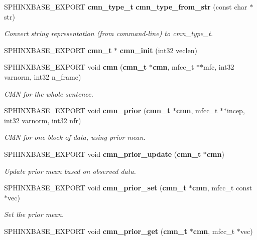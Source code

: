 \begin{DoxyCompactItemize}
\item 
\-S\-P\-H\-I\-N\-X\-B\-A\-S\-E\-\_\-\-E\-X\-P\-O\-R\-T {\bf cmn\-\_\-type\-\_\-t} {\bf cmn\-\_\-type\-\_\-from\-\_\-str} (const char $\ast$str)\label{cmn_8h_acf5e65a03a0d74630add4a400fed0ce8}

\begin{DoxyCompactList}\small\item\em \-Convert string representation (from command-\/line) to cmn\-\_\-type\-\_\-t. \end{DoxyCompactList}\item 
\-S\-P\-H\-I\-N\-X\-B\-A\-S\-E\-\_\-\-E\-X\-P\-O\-R\-T {\bf cmn\-\_\-t} $\ast$ {\bfseries cmn\-\_\-init} (int32 veclen)\label{cmn_8h_a7ba6ce5489afce232b9bb61bd2ebd20f}

\item 
\-S\-P\-H\-I\-N\-X\-B\-A\-S\-E\-\_\-\-E\-X\-P\-O\-R\-T void {\bf cmn} ({\bf cmn\-\_\-t} $\ast${\bf cmn}, mfcc\-\_\-t $\ast$$\ast$mfc, int32 varnorm, int32 n\-\_\-frame)
\begin{DoxyCompactList}\small\item\em \-C\-M\-N for the whole sentence. \end{DoxyCompactList}\item 
\-S\-P\-H\-I\-N\-X\-B\-A\-S\-E\-\_\-\-E\-X\-P\-O\-R\-T void {\bf cmn\-\_\-prior} ({\bf cmn\-\_\-t} $\ast${\bf cmn}, mfcc\-\_\-t $\ast$$\ast$incep, int32 varnorm, int32 nfr)
\begin{DoxyCompactList}\small\item\em \-C\-M\-N for one block of data, using prior mean. \end{DoxyCompactList}\item 
\-S\-P\-H\-I\-N\-X\-B\-A\-S\-E\-\_\-\-E\-X\-P\-O\-R\-T void {\bf cmn\-\_\-prior\-\_\-update} ({\bf cmn\-\_\-t} $\ast${\bf cmn})\label{cmn_8h_aae61df2ec71082520669fc63d94bb1ef}

\begin{DoxyCompactList}\small\item\em \-Update prior mean based on observed data. \end{DoxyCompactList}\item 
\-S\-P\-H\-I\-N\-X\-B\-A\-S\-E\-\_\-\-E\-X\-P\-O\-R\-T void {\bf cmn\-\_\-prior\-\_\-set} ({\bf cmn\-\_\-t} $\ast${\bf cmn}, mfcc\-\_\-t const $\ast$vec)\label{cmn_8h_a0f6f70d51143d6a33130650b8d4758ab}

\begin{DoxyCompactList}\small\item\em \-Set the prior mean. \end{DoxyCompactList}\item 
\-S\-P\-H\-I\-N\-X\-B\-A\-S\-E\-\_\-\-E\-X\-P\-O\-R\-T void {\bf cmn\-\_\-prior\-\_\-get} ({\bf cmn\-\_\-t} $\ast${\bf cmn}, mfcc\-\_\-t $\ast$vec)\label{cmn_8h_a4f624f5b805288f66fa05b79b1e4f383}


\end{DoxyCompactItemize}
